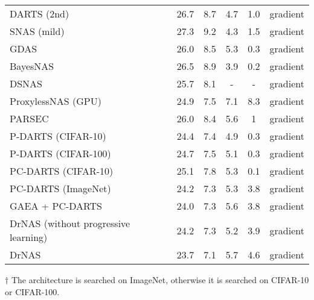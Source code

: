 \documentclass{article} \usepackage{iclr2021_conference,times}
\begin{document}
\begin{table}[!t]
{\begin{threeparttable}
\begin{tabular}{lccccc}
    DARTS (2nd)~\citep{darts} & 26.7 & 8.7 & 4.7 & 1.0 & gradient \\
    SNAS (mild)~\citep{snas} & 27.3 & 9.2 & 4.3 & 1.5 & gradient \\
    GDAS~\citep{gdas} & 26.0 & 8.5 & 5.3 & 0.3 & gradient \\
    BayesNAS~\citep{BayesNAS} & 26.5 & 8.9 & 3.9 & 0.2 & gradient \\
    DSNAS~\citep{dsnas}\tnote{$\dagger$} & 25.7 & 8.1 & - & - & gradient \\
    ProxylessNAS (GPU)~\citep{proxylessnas}\tnote{$\dagger$} & 24.9 & 7.5 & 7.1 & 8.3 & gradient \\
    PARSEC~\citep{parsec} & 26.0 & 8.4 & 5.6 & 1 & gradient \\
    P-DARTS (CIFAR-10)~\citep{pdarts} & 24.4 & 7.4 & 4.9 & 0.3 & gradient \\ 
    P-DARTS (CIFAR-100)~\citep{pdarts} & 24.7 & 7.5 & 5.1 & 0.3 & gradient \\ 
    PC-DARTS (CIFAR-10)~\citep{pcdarts} & 25.1 & 7.8 & 5.3 & 0.1 & gradient \\
    PC-DARTS (ImageNet)~\citep{pcdarts}\tnote{$\dagger$} & 24.2 & 7.3 & 5.3 & 3.8 & gradient \\ 
    GAEA + PC-DARTS~\citep{gaea}\tnote{$\dagger$} & 24.0 & 7.3 & 5.6 & 3.8 & gradient \\ \hline
    
    DrNAS (without progressive learning)\tnote{$\dagger$} & 24.2 & 7.3 & 5.2 & 3.9 & gradient \\ 
    DrNAS\tnote{$\dagger$} & 23.7 & 7.1 & 5.7 & 4.6 & gradient \\ \hline
    \end{tabular}
    \begin{tablenotes}
        \item[$\dagger$] The architecture is searched on ImageNet, otherwise it is searched on CIFAR-10 or CIFAR-100.
    \end{tablenotes}
    \end{threeparttable}}
    \label{tab:imagenet}
    \vspace{-2.5mm}
\end{table}
\end{document}
